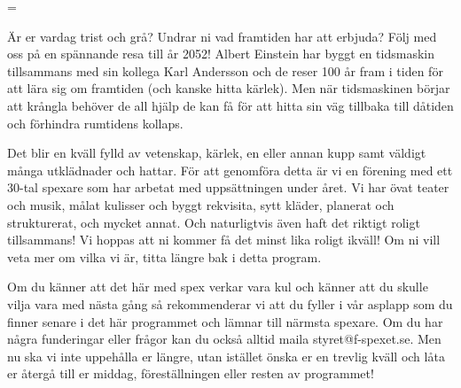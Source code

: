 \begingroup
\fontsize{12}{12}\selectfont
\parskip=\baselineskip
\vspace{-0.5cm}\centering\large{\textit{\textsc{}}}
\begin{adjustwidth}{23pt}{23pt}
Är er vardag trist och grå? Undrar ni vad framtiden har att erbjuda? Följ med oss på en spännande resa till år 2052! Albert Einstein har byggt en tidsmaskin tillsammans med sin kollega Karl Andersson och de reser 100 år fram i tiden för att lära sig om framtiden (och kanske hitta kärlek). Men när tidsmaskinen börjar att krångla behöver de all hjälp de kan få för att hitta sin väg tillbaka till dåtiden och förhindra rumtidens kollaps.

Det blir en kväll fylld av vetenskap, kärlek, en eller annan kupp samt väldigt många utklädnader och hattar. För att genomföra detta är vi en förening med ett 30-tal spexare som har arbetat med uppsättningen under året. Vi har övat teater och musik, målat kulisser och byggt rekvisita, sytt kläder, planerat och strukturerat, och mycket annat. Och naturligtvis även haft det riktigt roligt tillsammans! Vi hoppas att ni kommer få det minst lika roligt ikväll! Om ni vill veta mer om vilka vi är, titta längre bak i detta program.

Om du känner att det här med spex verkar vara kul och känner att du skulle vilja vara med nästa gång så rekommenderar vi att du fyller i vår asplapp som du finner senare i det här programmet och lämnar till närmsta spexare. Om du har några funderingar eller frågor kan du också alltid maila styret@f-spexet.se. Men nu ska vi inte uppehålla er längre, utan istället önska er en trevlig kväll och låta er återgå till er middag, föreställningen eller resten av programmet!

\begin{flushright}
\textit{\textsc{}}
\end{flushright}
\end{adjustwidth}

\endgroup
